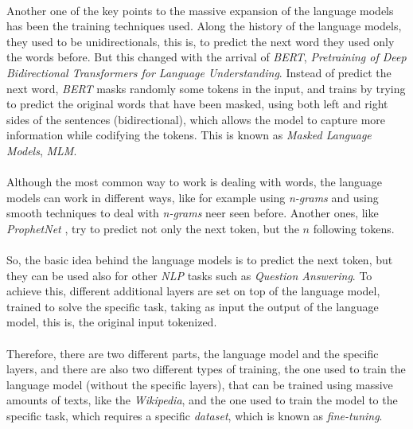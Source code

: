 \paragraph{}
Another one of the key points to the massive expansion of the language models has been the training techniques used. Along the history of the language models, they used to be unidirectionals, this is, to predict the next word they used only the words before. But this changed with the arrival of \emph{BERT}, \emph{Pre\-training of Deep Bidirectional Transformers for Language Understanding}. \cite{Devlin2018} Instead of predict the next word, \emph{BERT} masks randomly some tokens in the input, and trains by trying to predict the original words that have been masked, using both left and right sides of the sentences (bidirectional), which allows the model to capture more information while codifying the tokens. This is known as \emph{Masked Language Models}, \emph{MLM}.
\paragraph{}
Although the most common way to work is dealing with words, the language models can work in different ways, like for example using \emph{n-grams} and using smooth techniques to deal with \emph{n-grams} neer seen before\cite{Knesser1995}. Another ones, like \emph{ProphetNet} \cite{Yan2020}, try to predict not only the next token, but the $n$ following tokens.
\paragraph{}
So, the basic idea behind the language models is to predict the next token, but they can be used also for other \emph{NLP} tasks such as \emph{Question Answering}. To achieve this, different additional layers are set on top of the language model, trained to solve the specific task, taking as input the output of the language model, this is, the original input tokenized. 
\paragraph{}
Therefore, there are two different parts, the language model and the specific layers, and there are also two different types of training, the one used to train the language model (without the specific layers), that can be trained using massive amounts of texts, like the \emph{Wikipedia}, and the one used to train the model to the specific task, which requires a specific \emph{dataset}, which is known as \emph{fine-tuning}.

